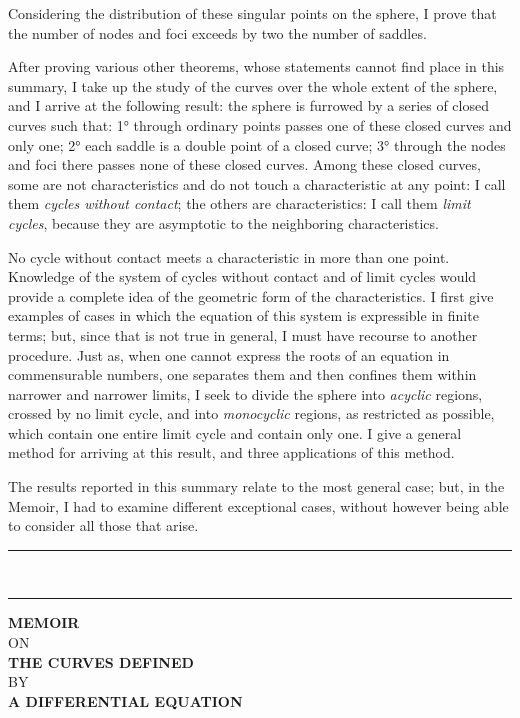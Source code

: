 \documentclass[11pt]{article}
\newcommand{\ornament}{\begin{center}\rule{2.5em}{0.4pt}\,\raisebox{0.1ex}{\tiny$\bullet\bullet\bullet$}\,\rule{2.5em}{0.4pt}\end{center}}
\begin{document}
Considering the distribution of these singular points on the sphere, I prove that the number of nodes and foci exceeds by two the number of saddles.

After proving various other theorems, whose statements cannot find place in this summary, I take up the study of the curves over the whole extent of the sphere, and I arrive at the following result: the sphere is furrowed by a series of closed curves such that: 1° through ordinary points passes one of these closed curves and only one; 2° each saddle is a double point of a closed curve; 3° through the nodes and foci there passes none of these closed curves. Among these closed curves, some are not characteristics and do not touch a characteristic at any point: I call them \emph{cycles without contact}; the others are characteristics: I call them \emph{limit cycles}, because they are asymptotic to the neighboring characteristics.

No cycle without contact meets a characteristic in more than one point. Knowledge of the system of cycles without contact and of limit cycles would provide a complete idea of the geometric form of the characteristics. I first give examples of cases in which the equation of this system is expressible in finite terms; but, since that is not true in general, I must have recourse to another procedure. Just as, when one cannot express the roots of an equation in commensurable numbers, one separates them and then confines them within narrower and narrower limits, I seek to divide the sphere into \emph{acyclic} regions, crossed by no limit cycle, and into \emph{monocyclic} regions, as restricted as possible, which contain one entire limit cycle and contain only one. I give a general method for arriving at this result, and three applications of this method.

The results reported in this summary relate to the most general case; but, in the Memoir, I had to examine different exceptional cases, without however being able to consider all those that arise.

\ornament

\clearpage

\setcounter{footnote}{0}
\begin{center}
{\large\bfseries MEMOIR}\\[0.8em]
{\small ON}\\[0.8em]
{\Large\bfseries THE CURVES DEFINED}\\[0.8em]
{\small BY}\\[0.8em]
{\large\bfseries A DIFFERENTIAL EQUATION}
\end{center}
\end{document}
